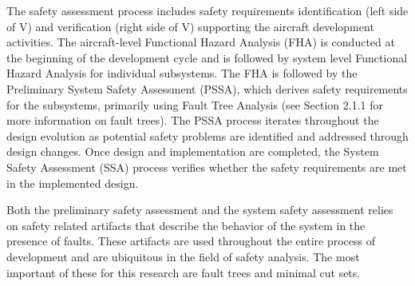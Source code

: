 The safety assessment process includes safety requirements identification (left side of V) and verification (right side of V) supporting the aircraft development activities. The aircraft-level Functional Hazard Analysis (FHA) is conducted at the beginning of the development cycle and is followed by system level Functional Hazard Analysis for individual subsystems. The FHA is followed by the Preliminary System Safety Assessment (PSSA), which derives safety requirements for the subsystems, primarily using Fault Tree Analysis (see Section 2.1.1 for more information on fault trees). The PSSA process iterates throughout the design evolution as potential safety problems are identified and addressed through design changes. Once design and implementation are completed, the System Safety Assessment (SSA) process verifies whether the safety requirements are met in the implemented design. 

Both the preliminary safety assessment and the system safety assessment relies on safety related artifacts that describe the behavior of the system in the presence of faults. These artifacts are used throughout the entire process of development and are ubiquitous in the field of safety analysis. The most important of these for this research are fault trees and minimal cut sets. 







